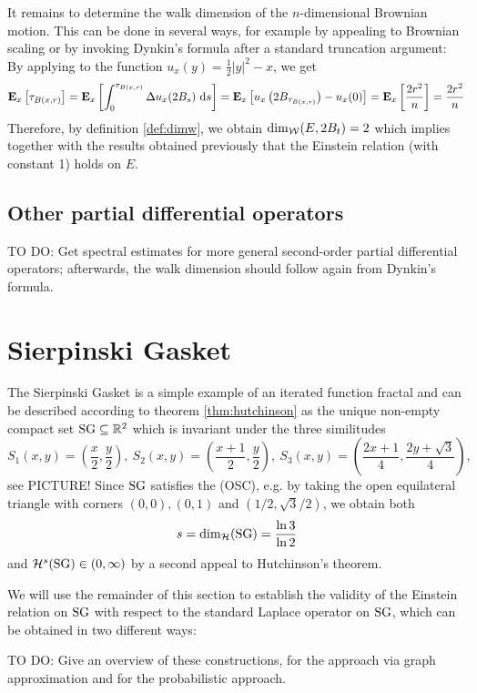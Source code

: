 It remains to determine the walk dimension of the $n$-dimensional Brownian motion. This can be done in several ways, for example by appealing to Brownian scaling or by invoking Dynkin's formula after a standard truncation argument: By applying \cite[Lemma 19.21]{kallenberg2002foundations} to the function $u_x(y)=\frac{1}{2}|y|^2-x$, we get
\[
  \PTEp{\tau_{B(x,r)}}{x}
  =\PTEp{\int_0^{\tau_{B(x,r)}}\gD u_x(2B_s)\,\Di s}{x}
  =\PTEp{u_x\left(2B_{\tau_{B(x,r)}}\right)-u_x(0)}{x}
  =\PTEp{\frac{2r^2}{n}}{x}
  =\frac{2r^2}{n}
\]
Therefore, by definition \ref{def:dimw}, we obtain $\dimw(E,2B_t)=2$ which implies together with the results obtained previously that the Einstein relation (with constant 1) holds on $E$. 


\subsection{Other partial differential operators}

TO DO: Get spectral estimates for more general second-order partial differential operators; afterwards, the walk dimension should follow again from Dynkin's formula. 


\section{Sierpinski Gasket}

The Sierpinski Gasket is a simple example of an iterated function fractal and can be described according to theorem \ref{thm:hutchinson} as the unique non-empty compact set $\SG\ssq\IR^2$ which is invariant under the three similitudes 
\[
  S_1(x,y)=\left(\frac{x}{2},\frac{y}{2}\right),\ 
  S_2(x,y)=\left(\frac{x+1}{2},\frac{y}{2}\right),\ 
  S_3(x,y)=\left(\frac{2x+1}{4},\frac{2y+\sqrt{3}}{4}\right),
\]
see PICTURE! Since $\SG$ satisfies the (OSC), e.g. by taking the open equilateral triangle with corners $(0,0), (0,1)$ and $(1/2,\sqrt{3}/2)$, we obtain both 
\begin{equation}\label{eq:SGdimh}
  s=\dimh(\SG)=\frac{\ln 3}{\ln 2}
\end{equation}
and $\cH^s(\SG)\in(0,\infty)$ by a second appeal to Hutchinson's theorem. 

We will use the remainder of this section to establish the validity of the Einstein relation on $\SG$ with respect to the standard Laplace operator on $\SG$, which can be obtained in two different ways:

TO DO: Give an overview of these constructions, \cite{strichartz2006differential} for the approach via graph approximation and \cite{barlow1998diffusions} for the probabilistic approach.

